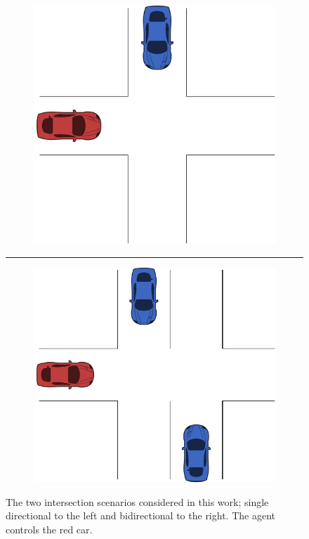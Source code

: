 \begin{figure}[t]
	\centering
	\begin{subfigure}[t]{0.4\columnwidth}
		\centering
		\includegraphics[width=\columnwidth]{figures/figures-scenario1.pdf}
		
	\end{subfigure}
	\hfill
	\rule{0.5px}{100px}
	\hfill
	\begin{subfigure}[t]{0.45\columnwidth}
		\centering
		\includegraphics[width=\columnwidth]{figures/figures-scenario2.pdf}
	\end{subfigure}
	
	\caption{The two intersection scenarios considered in this work; single directional to the left and bidirectional to the right. The agent controls the red car.}
	\label{fig:scenarios}
\end{figure}


